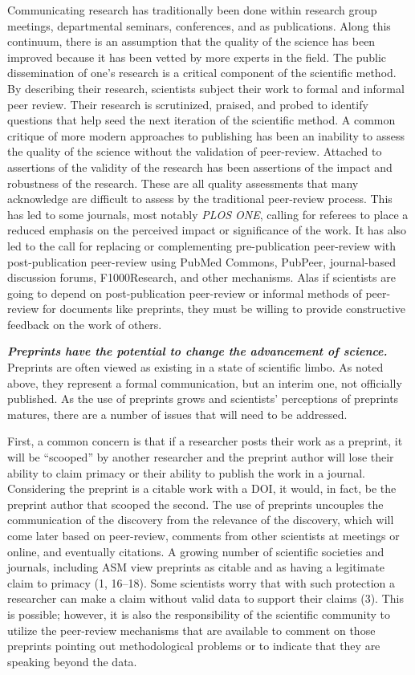 \documentclass[11pt,]{article}
\begin{document}
Communicating research has traditionally been done within research group
meetings, departmental seminars, conferences, and as publications. Along
this continuum, there is an assumption that the quality of the science
has been improved because it has been vetted by more experts in the
field. The public dissemination of one's research is a critical
component of the scientific method. By describing their research,
scientists subject their work to formal and informal peer review. Their
research is scrutinized, praised, and probed to identify questions that
help seed the next iteration of the scientific method. A common critique
of more modern approaches to publishing has been an inability to assess
the quality of the science without the validation of peer-review.
Attached to assertions of the validity of the research has been
assertions of the impact and robustness of the research. These are all
quality assessments that many acknowledge are difficult to assess by the
traditional peer-review process. This has led to some journals, most
notably \emph{PLOS ONE}, calling for referees to place a reduced
emphasis on the perceived impact or significance of the work. It has
also led to the call for replacing or complementing pre-publication
peer-review with post-publication peer-review using PubMed Commons,
PubPeer, journal-based discussion forums, F1000Research, and other
mechanisms. Alas if scientists are going to depend on post-publication
peer-review or informal methods of peer-review for documents like
preprints, they must be willing to provide constructive feedback on the
work of others.

\textbf{\emph{Preprints have the potential to change the advancement of
science.}} Preprints are often viewed as existing in a state of
scientific limbo. As noted above, they represent a formal communication,
but an interim one, not officially published. As the use of preprints
grows and scientists' perceptions of preprints matures, there are a
number of issues that will need to be addressed.

First, a common concern is that if a researcher posts their work as a
preprint, it will be ``scooped'' by another researcher and the preprint
author will lose their ability to claim primacy or their ability to
publish the work in a journal. Considering the preprint is a citable
work with a DOI, it would, in fact, be the preprint author that scooped
the second. The use of preprints uncouples the communication of the
discovery from the relevance of the discovery, which will come later
based on peer-review, comments from other scientists at meetings or
online, and eventually citations. A growing number of scientific
societies and journals, including ASM view preprints as citable and as
having a legitimate claim to primacy (1, 16--18). Some scientists worry
that with such protection a researcher can make a claim without valid
data to support their claims (3). This is possible; however, it is also
the responsibility of the scientific community to utilize the
peer-review mechanisms that are available to comment on those preprints
pointing out methodological problems or to indicate that they are
speaking beyond the data.
\end{document}
